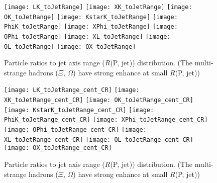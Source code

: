 \begin{figure}[ht]
	\begin{center}
                \texttt{[image: LK\_toJetRange]}
                \texttt{[image: XK\_toJetRange]}
                \texttt{[image: OK\_toJetRange]}
                \texttt{[image: KstarK\_toJetRange]}
                \texttt{[image: PhiK\_toJetRange]}
                \texttt{[image: XPhi\_toJetRange]}
                \texttt{[image: OPhi\_toJetRange]}
                \texttt{[image: XL\_toJetRange]}
                \texttt{[image: OL\_toJetRange]}
                \texttt{[image: OX\_toJetRange]}
	\end{center}
	\caption{Particle ratios to jet axis range ($R$(P, jet)) distribution. (The multi-strange hadrons ($\Xi$, $\Omega$) have strong enhance at small $R$(P, jet))}
	\label{fig:ParRatiotoJet}
\end{figure}

\begin{figure}[ht]
	\begin{center}
		\texttt{[image: LK\_toJetRange\_cent\_CR]}
		\texttt{[image: XK\_toJetRange\_cent\_CR]}
		\texttt{[image: OK\_toJetRange\_cent\_CR]}
		\texttt{[image: KstarK\_toJetRange\_cent\_CR]}
		\texttt{[image: PhiK\_toJetRange\_cent\_CR]}
		\texttt{[image: XPhi\_toJetRange\_cent\_CR]}
		\texttt{[image: OPhi\_toJetRange\_cent\_CR]}
		\texttt{[image: XL\_toJetRange\_cent\_CR]}
		\texttt{[image: OL\_toJetRange\_cent\_CR]}
		\texttt{[image: OX\_toJetRange\_cent\_CR]}
	\end{center}
	\caption{Particle ratios to jet axis range ($R$(P, jet)) distribution. (The multi-strange hadrons ($\Xi$, $\Omega$) have strong enhance at small $R$(P, jet))}
	\label{fig:ParRatiotoJetCR}
\end{figure}

